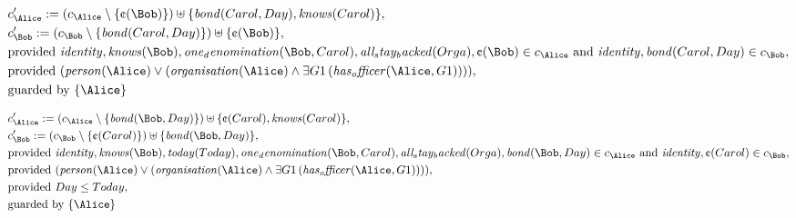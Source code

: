 \begin{align*}
&
c'_
{
\Alice
}
 := 
(c_
{
\Alice
}
 \setminus 
\{
\text{\textcent}
(
\Bob
)
\}
) \uplus 
\{
\mathit{
bond
}
(
Carol
,
Day
)
,
\mathit{
knows
}
(
Carol
)
\}
,\\
&
c'_
{
\Bob
}
 := 
(c_
{
\Bob
}
 \setminus 
\{
\mathit{
bond
}
(
Carol
,
Day
)
\}
) \uplus 
\{
\text{\textcent}
(
\Bob
)
\}
,\\
&
\text{provided } 
\mathit{
identity
}
,
\mathit{
knows
}
(
\Bob
)
,
\mathit{
one_denomination
}
(
\Bob
,
Carol
)
,
\mathit{
all_stay_backed
}
(
Orga
)
,
\text{\textcent}
(
\Bob
)
 \in c_
{
\Alice
}
 \text{ and } 
\mathit{
identity
}
,
\mathit{
bond
}
(
Carol
,
Day
)
 \in c_
{
\Bob
}
,\\
&
\text{provided } 
(
\mathit{
person
}
(
\Alice
)
\lor
(
\mathit{
organisation
}
(
\Alice
)
\land
\exists 
G1
\,(
\mathit{
has_officer
}
(
\Alice
,
G1
)
)
)
)
,\\
&
\text{guarded by } \{
\Alice
\}
\end{align*}

\begin{align*}
&
c'_
{
\Alice
}
 := 
(c_
{
\Alice
}
 \setminus 
\{
\mathit{
bond
}
(
\Bob
,
Day
)
\}
) \uplus 
\{
\text{\textcent}
(
Carol
)
,
\mathit{
knows
}
(
Carol
)
\}
,\\
&
c'_
{
\Bob
}
 := 
(c_
{
\Bob
}
 \setminus 
\{
\text{\textcent}
(
Carol
)
\}
) \uplus 
\{
\mathit{
bond
}
(
\Bob
,
Day
)
\}
,\\
&
\text{provided } 
\mathit{
identity
}
,
\mathit{
knows
}
(
\Bob
)
,
\mathit{
today
}
(
Today
)
,
\mathit{
one_denomination
}
(
\Bob
,
Carol
)
,
\mathit{
all_stay_backed
}
(
Orga
)
,
\mathit{
bond
}
(
\Bob
,
Day
)
 \in c_
{
\Alice
}
 \text{ and } 
\mathit{
identity
}
,
\text{\textcent}
(
Carol
)
 \in c_
{
\Bob
}
,\\
&
\text{provided } 
(
\mathit{
person
}
(
\Alice
)
\lor
(
\mathit{
organisation
}
(
\Alice
)
\land
\exists 
G1
\,(
\mathit{
has_officer
}
(
\Alice
,
G1
)
)
)
)
,\\
&
\text{provided } 
Day
\le
Today
,\\
&
\text{guarded by } \{
\Alice
\}
\end{align*}

